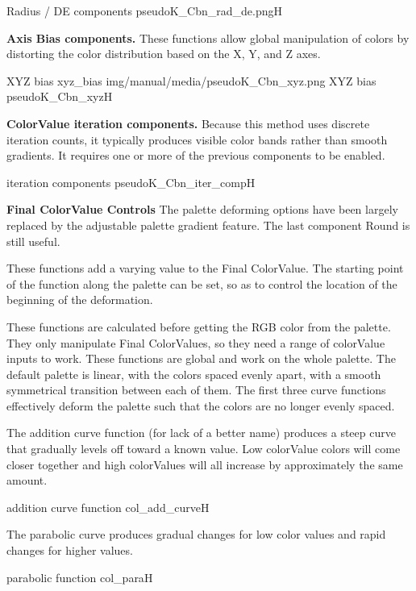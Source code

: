 {Radius / DE components}
{pseudoK_Cbn_rad_de.png}{H}

\textbf{Axis Bias components.} These functions allow global manipulation of colors by distorting the color distribution based on the X, Y, and Z axes.
 
{XYZ bias}
{xyz_bias}
{img/manual/media/pseudoK_Cbn_xyz.png}
{XYZ bias}
{pseudoK_Cbn_xyz}{H}

\textbf{ColorValue iteration components.} Because this method uses discrete iteration counts, it typically produces visible color bands rather than smooth gradients. It requires one or more of the previous components to be enabled.

{iteration components}
{pseudoK_Cbn_iter_comp}{H}

\textbf{Final ColorValue Controls}
The palette deforming options have been largely replaced by the adjustable palette gradient feature. The last component Round is still useful.

These functions add a varying value to the Final ColorValue. The starting point of the function along the palette can be set, so as to control the location of the beginning of the deformation.

These functions are calculated before getting the RGB color from the palette. They only manipulate Final ColorValues, so they need a range of colorValue inputs to work. These functions are global and work on the whole palette. The default palette is linear, with the colors spaced evenly apart, with a smooth symmetrical transition between each of them. The first three curve functions effectively deform the palette such that the colors are no longer evenly spaced.

The addition curve function (for lack of a better name) produces a steep curve that gradually levels off toward a known value. Low colorValue colors will come closer together and high colorValues will all increase by approximately the same amount.

{addition curve function}
{col_add_curve}{H}

The parabolic curve produces gradual changes for low color values and rapid changes for higher values.

{parabolic function}
{col_para}{H}

